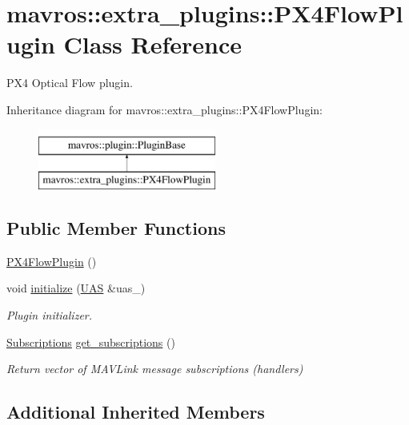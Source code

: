 \hypertarget{classmavros_1_1extra__plugins_1_1PX4FlowPlugin}{}\section{mavros\+::extra\+\_\+plugins\+::P\+X4\+Flow\+Plugin Class Reference}
\label{classmavros_1_1extra__plugins_1_1PX4FlowPlugin}


P\+X4 Optical Flow plugin.  


Inheritance diagram for mavros\+::extra\+\_\+plugins\+::P\+X4\+Flow\+Plugin\+:\begin{figure}[H]
\begin{center}
\leavevmode
\includegraphics[height=2.000000cm]{classmavros_1_1extra__plugins_1_1PX4FlowPlugin}
\end{center}
\end{figure}
\subsection*{Public Member Functions}
\begin{DoxyCompactItemize}
\item 
\mbox{\hyperlink{group__plugin_ga865789c98ace44070bec3c1f9fdc6201}{P\+X4\+Flow\+Plugin}} ()
\item 
void \mbox{\hyperlink{group__plugin_ga6b15368f120713a52cb776ad210a052b}{initialize}} (\mbox{\hyperlink{classmavros_1_1UAS}{U\+AS}} \&uas\+\_\+)
\begin{DoxyCompactList}\small\item\em Plugin initializer. \end{DoxyCompactList}\item 
\mbox{\hyperlink{group__plugin_ga8967d61fc77040e0c3ea5a4585d62a09}{Subscriptions}} \mbox{\hyperlink{group__plugin_ga70d7cb3f7611e394d7a0d85ca5e2dcf5}{get\+\_\+subscriptions}} ()
\begin{DoxyCompactList}\small\item\em Return vector of M\+A\+V\+Link message subscriptions (handlers) \end{DoxyCompactList}\end{DoxyCompactItemize}
\subsection*{Additional Inherited Members}


